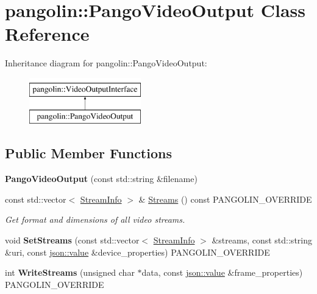 \hypertarget{classpangolin_1_1_pango_video_output}{}\section{pangolin\+:\+:Pango\+Video\+Output Class Reference}
\label{classpangolin_1_1_pango_video_output}
Inheritance diagram for pangolin\+:\+:Pango\+Video\+Output\+:\begin{figure}[H]
\begin{center}
\leavevmode
\includegraphics[height=2.000000cm]{classpangolin_1_1_pango_video_output}
\end{center}
\end{figure}
\subsection*{Public Member Functions}
\begin{DoxyCompactItemize}
\item 
{\bfseries Pango\+Video\+Output} (const std\+::string \&filename)\hypertarget{classpangolin_1_1_pango_video_output_aec31206b29c247ca1f7d398000a10392}{}\label{classpangolin_1_1_pango_video_output_aec31206b29c247ca1f7d398000a10392}

\item 
const std\+::vector$<$ \hyperlink{classpangolin_1_1_stream_info}{Stream\+Info} $>$ \& \hyperlink{classpangolin_1_1_pango_video_output_ac23bcb781e1bea1a76643ab2e425826e}{Streams} () const P\+A\+N\+G\+O\+L\+I\+N\+\_\+\+O\+V\+E\+R\+R\+I\+DE\hypertarget{classpangolin_1_1_pango_video_output_ac23bcb781e1bea1a76643ab2e425826e}{}\label{classpangolin_1_1_pango_video_output_ac23bcb781e1bea1a76643ab2e425826e}

\begin{DoxyCompactList}\small\item\em Get format and dimensions of all video streams. \end{DoxyCompactList}\item 
void {\bfseries Set\+Streams} (const std\+::vector$<$ \hyperlink{classpangolin_1_1_stream_info}{Stream\+Info} $>$ \&streams, const std\+::string \&uri, const \hyperlink{classpangolin_1_1json_1_1value}{json\+::value} \&device\+\_\+properties) P\+A\+N\+G\+O\+L\+I\+N\+\_\+\+O\+V\+E\+R\+R\+I\+DE\hypertarget{classpangolin_1_1_pango_video_output_a0538af17827c5a94d32c35206cb066ed}{}\label{classpangolin_1_1_pango_video_output_a0538af17827c5a94d32c35206cb066ed}

\item 
int {\bfseries Write\+Streams} (unsigned char $\ast$data, const \hyperlink{classpangolin_1_1json_1_1value}{json\+::value} \&frame\+\_\+properties) P\+A\+N\+G\+O\+L\+I\+N\+\_\+\+O\+V\+E\+R\+R\+I\+DE\hypertarget{classpangolin_1_1_pango_video_output_afe472eb97d705bbcbbade0bcf3f0371e}{}\label{classpangolin_1_1_pango_video_output_afe472eb97d705bbcbbade0bcf3f0371e}

\end{DoxyCompactItemize}
